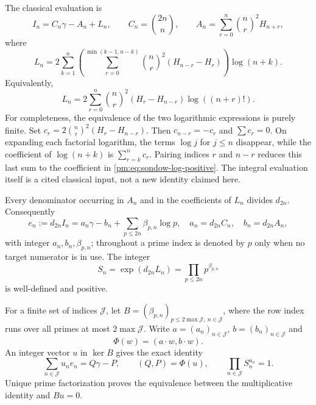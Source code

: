 \documentclass[11pt,a4paper]{article}
\theoremstyle{definition}
\theoremstyle{remark}
\numberwithin{equation}{section}
\begin{document}
The classical evaluation \cite{pm:Sondow2003,pm:SondowZlobin2004} is
\begin{equation}\label{pm:eq:sondow-decomp}
 I_n=C_n\gamma-A_n+L_n,\qquad
 C_n=\binom{2n}{n},\qquad
 A_n=\sum_{r=0}^n\binom nr^2H_{n+r},
\end{equation}
where
\begin{equation}\label{pm:eq:sondow-log-positive}
 L_n=2\sum_{k=1}^n\left(
 \sum_{r=0}^{\min(k-1,n-k)}
 \binom nr^2(H_{n-r}-H_r)\right)\log(n+k).
\end{equation}
Equivalently,
\begin{equation}\label{pm:eq:sondow-log-factorial}
 L_n=2\sum_{r=0}^n\binom nr^2(H_r-H_{n-r})\log((n+r)!).
\end{equation}
For completeness, the equivalence of the two logarithmic expressions is
purely finite.  Set $c_r=2\binom nr^2(H_r-H_{n-r})$.  Then
$c_{n-r}=-c_r$ and $\sum c_r=0$.  On expanding each factorial logarithm,
the terms $\log j$ for $j\le n$ disappear, while the coefficient of
$\log(n+k)$ is $\sum_{r=k}^n c_r$.  Pairing indices $r$ and $n-r$
reduces this last sum to the coefficient in
\eqref{pm:eq:sondow-log-positive}.
The integral evaluation itself is a cited classical input, not a new
identity claimed here.

Every denominator occurring in $A_n$ and in the coefficients of $L_n$
divides $d_{2n}$.  Consequently
\begin{equation}\label{pm:eq:integer-form}
 e_n:=d_{2n}I_n
 =a_n\gamma-b_n+\sum_{p\le2n}\beta_{p,n}\log p,
 \quad a_n=d_{2n}C_n,\quad b_n=d_{2n}A_n,
\end{equation}
with integer $a_n,b_n,\beta_{p,n}$; throughout a prime index is denoted
by $p$ only when no target numerator is in use.  The integer
\begin{equation}\label{pm:eq:sondow-integer}
 S_n=\exp(d_{2n}L_n)=\prod_{p\le2n}p^{\beta_{p,n}}
\end{equation}
is well-defined and positive.

For a finite set of indices $\mathcal J$, let
$B=(\beta_{p,n})_{p\le2\max\mathcal J,\ n\in\mathcal J}$, where the row index runs over all
primes at most $2\max\mathcal J$.  Write $a=(a_n)_{n\in\mathcal J}$,
$b=(b_n)_{n\in\mathcal J}$ and
\[
 \Phi(w)=(a\cdot w,b\cdot w).
\]
An integer vector $u$ in $\ker B$ gives the exact identity
\begin{equation}\label{pm:eq:eliminated-form}
 \sum_{n\in\mathcal J}u_ne_n=Q\gamma-P,
 \qquad (Q,P)=\Phi(u),\qquad
 \prod_{n\in\mathcal J}S_n^{u_n}=1.
\end{equation}
Unique prime factorization proves the equivalence between the multiplicative
identity and $Bu=0$.
\end{document}
